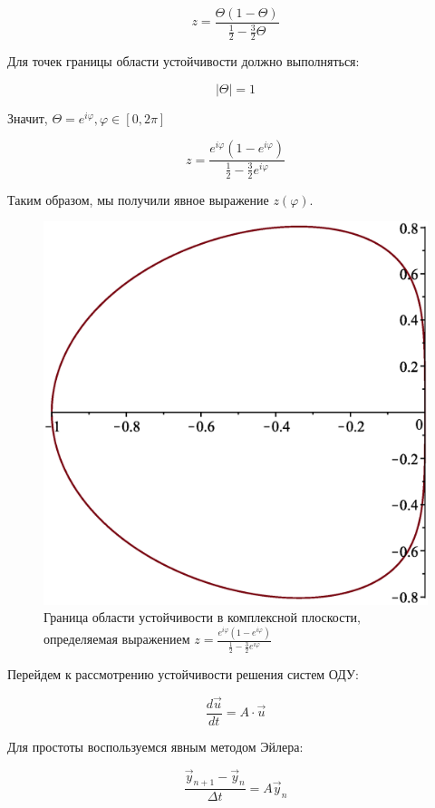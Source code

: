 \documentclass[10pt,a4paper]{article}
\begin{document}
	\begin{equation}
		z = \frac{\Theta\left(1 - \Theta\right)}{\frac{1}{2} - \frac{3}{2}
		\Theta}
	\end{equation}
	
	Для точек границы области устойчивости должно выполняться:
	
	\begin{equation}
		\left|\Theta\right| = 1
	\end{equation}
	
	Значит, $\Theta  = e^{i\varphi}, \varphi \in \left[0, 2\pi\right]$
	
	\begin{equation}
		z = \frac{e^{i\varphi}\left(1 - e^{i\varphi}\right)}{\frac{1}{2} - 
		\frac{3}{2}e^{i\varphi}}
	\end{equation}
	
	Таким образом, мы получили явное выражение $z(\varphi)$.
	
	\begin{figure}[h!]
		\centering
		\includegraphics[width = 0.5\linewidth,keepaspectratio]
		{Zone_boarder.eps}
		\caption{Граница области устойчивости в комплексной плоскости,
	 	определяемая выражением 
		$z = \frac{e^{i\varphi}\left(1 - e^{i\varphi}\right)}{\frac{1}{2} - 
		\frac{3}{2}e^{i\varphi}}$}
	\end{figure}
	
	Перейдем к рассмотрению устойчивости решения систем ОДУ:
	
	\begin{equation}
		\frac{d\vec{u}}{dt} = A\cdot\vec{u}
	\end{equation}
	
	Для простоты воспользуемся явным методом Эйлера:
	
	\begin{equation}
		\frac{\vec{y}_{n + 1} - \vec{y}_{n}}{\Delta t} = A\vec{y}_{n}
	\end{equation}
	
\end{document}
